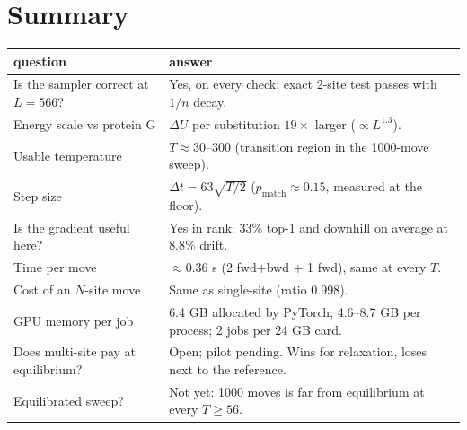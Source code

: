 \documentclass[11pt,a4paper]{article}
\newcommand{\dt}{\Delta t}
\begin{document}
\section{Summary}
\begin{center}
\small
\begin{tabular}{@{}p{}p{}@{}}
\toprule
question & answer \\
\midrule
Is the sampler correct at $L=566$? & Yes, on every check; exact 2-site test passes with $1/n$ decay. \\
Energy scale vs protein G & $\Delta U$ per substitution $19\times$ larger ($\propto L^{1.3}$). \\
Usable temperature & $T\approx30$--$300$ (transition region in the 1000-move sweep). \\
Step size & $\dt=63\sqrt{T/2}$ ($p_{\mathrm{match}}\approx0.15$, measured at the floor). \\
Is the gradient useful here? & Yes in rank: 33\% top-1 and downhill on average at 8.8\% drift. \\
Time per move & $\approx0.36$ s (2 fwd+bwd + 1 fwd), same at every $T$. \\
Cost of an $N$-site move & Same as single-site (ratio 0.998). \\
GPU memory per job & 6.4 GB allocated by PyTorch; 4.6--8.7 GB per process; 2 jobs per 24 GB card. \\
Does multi-site pay at equilibrium? & Open; pilot pending. Wins for relaxation, loses next to the reference. \\
Equilibrated sweep? & Not yet: 1000 moves is far from equilibrium at every $T\ge56$. \\
\bottomrule
\end{tabular}
\end{center}
\end{document}
